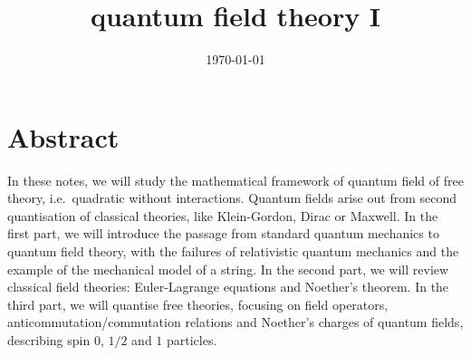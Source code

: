 \documentclass[a4paper, 12pt]{memoir}
\title{quantum field theory I}
\date{\today}
\begin{document}
\frontmatter



\tableofcontents

\mainmatter



\chapter*{Abstract}

    In these notes, we will study the mathematical framework of quantum field of free theory, i.e.~quadratic without interactions. Quantum fields arise out from second quantisation of classical theories, like Klein-Gordon, Dirac or Maxwell. In the first part, we will introduce the passage from standard quantum mechanics to quantum field theory, with the failures of relativistic quantum mechanics and the example of the mechanical model of a string. In the second part, we will review classical field theories: Euler-Lagrange equations and Noether's theorem. In the third part, we will quantise free theories, focusing on field operators, anticommutation/commutation relations and Noether's charges of quantum fields, describing spin $0$, $1/2$ and $1$ particles.
    






\backmatter
\nocite{qft1lecture}

\clearpage
{}
\printbibliography
\end{document}
